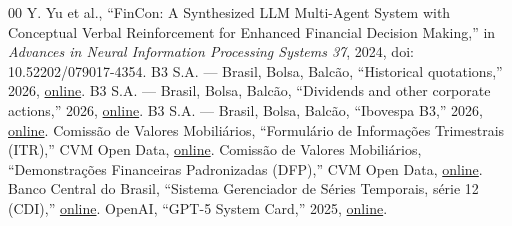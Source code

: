\documentclass[10pt,conference]{IEEEtran}
\begin{document}
\begin{thebibliography}{00}
 Y. Yu et al., ``FinCon: A Synthesized LLM Multi-Agent System with Conceptual Verbal Reinforcement for Enhanced Financial Decision Making,'' in \emph{Advances in Neural Information Processing Systems 37}, 2024, doi: 10.52202/079017-4354.
 B3 S.A. --- Brasil, Bolsa, Balc\~ao, ``Historical quotations,'' 2026, \href{https://www.b3.com.br/pt_br/market-data-e-indices/servicos-de-dados/market-data/historico/mercado-a-vista/cotacoes-historicas/}{online}.
 B3 S.A. --- Brasil, Bolsa, Balc\~ao, ``Dividends and other corporate actions,'' 2026, \href{https://sistemaswebb3-listados.b3.com.br/dividensOtherCorpActPage/}{online}.
 B3 S.A. --- Brasil, Bolsa, Balc\~ao, ``Ibovespa B3,'' 2026, \href{https://www.b3.com.br/pt_br/market-data-e-indices/indices/indices-amplos/ibovespa.htm}{online}.
 Comiss\~ao de Valores Mobili\'arios, ``Formul\'ario de Informa\c{c}\~oes Trimestrais (ITR),'' CVM Open Data, \href{https://dados.cvm.gov.br/dados/CIA_ABERTA/DOC/ITR/DADOS/}{online}.
 Comiss\~ao de Valores Mobili\'arios, ``Demonstra\c{c}\~oes Financeiras Padronizadas (DFP),'' CVM Open Data, \href{https://dados.cvm.gov.br/dataset/cia_aberta-doc-dfp}{online}.
 Banco Central do Brasil, ``Sistema Gerenciador de S\'eries Temporais, s\'erie 12 (CDI),'' \href{https://www3.bcb.gov.br/sgspub/}{online}.
 OpenAI, ``GPT-5 System Card,'' 2025, \href{https://openai.com/index/gpt-5-system-card/}{online}.
\end{thebibliography}
\end{document}
